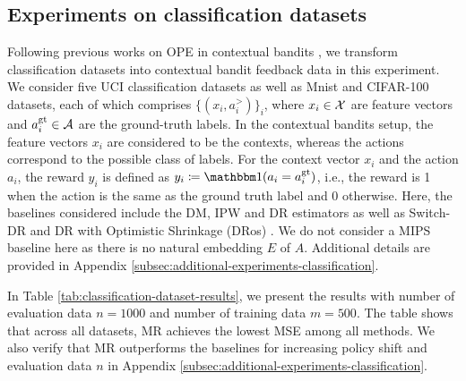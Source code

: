 \subsection{Experiments on classification datasets}
Following previous works on OPE in contextual bandits \citep{dudik2014doubly, kallus2021optimal, mehrdad2018more,wang2017optimal}, we transform classification datasets into contextual bandit feedback data in this experiment.
We consider five UCI classification datasets \citep{dua2019uci} as well as Mnist \citep{deng2012mnist} and CIFAR-100 \citep{krizhevsky2009learning} datasets, each of which comprises $\{(x_i, a^\gt_i)\}_{i}$, where $x_i\in \mathcal{X}$ are feature vectors and $a^{\textup{gt}}_i\in \mathcal{A}$ are the ground-truth labels.
In the contextual bandits setup, the feature vectors $x_i$ are considered to be the contexts, whereas the actions correspond to the possible class of labels. For the context vector $x_i$ and the action $a_i$, the reward $y_i$ is defined as $y_i \coloneqq \ind(a_i = a^\gt_i)$, i.e., the reward is 1 when the action is the same as the ground truth label and 0 otherwise. Here, the baselines considered include the DM, IPW and DR estimators as well as Switch-DR \citep{wang2017optimal} and DR with Optimistic Shrinkage (DRos) \citep{su2020doubly}. We do not consider a MIPS baseline here as there is no natural embedding $E$ of $A$. Additional details are provided in Appendix \ref{subsec:additional-experiments-classification}. 

In Table \ref{tab:classification-dataset-results}, we present the results with number of evaluation data $n=1000$ and number of training data $m=500$. 
The table shows that across all datasets, MR achieves the lowest MSE among all methods.  We also verify that MR outperforms the baselines for increasing policy shift and evaluation data $n$ in Appendix \ref{subsec:additional-experiments-classification}.


